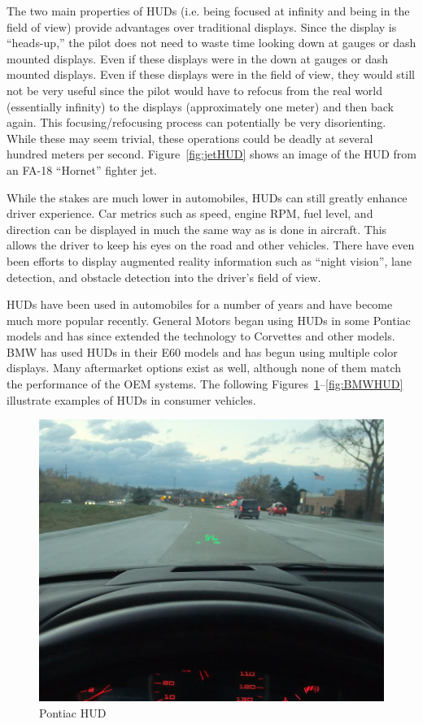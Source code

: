 The two main properties of HUDs (i.e. being focused at infinity and being
in the field of view) provide advantages over traditional displays. Since
the display is ``heads-up,'' the pilot does not need to waste time looking
down at gauges or dash mounted displays. Even if these displays were in the
down at gauges or dash mounted displays. Even if these displays were in the
field of view, they would still not be very useful since the pilot would
have to refocus from the real world (essentially infinity) to the displays
(approximately one meter) and then back again. This focusing/refocusing
process can potentially be very disorienting. While these may seem trivial,
these operations could be deadly at several hundred meters per second.
Figure~\ref{fig:jetHUD} shows an image of the HUD from an FA-18 ``Hornet''
fighter jet.

While the stakes are much lower in automobiles, HUDs can still greatly
enhance driver experience. Car metrics such as speed, engine RPM, fuel
level, and direction can be displayed in much the same way as is done in
aircraft. This allows the driver to keep his eyes on the road and other
vehicles. There have even been efforts to display augmented reality
information such as ``night vision'', lane detection, and obstacle detection
into the driver's field of view.

HUDs have been used in automobiles for a number of years and have become
much more popular recently. General Motors began using HUDs in some Pontiac
models and has since extended the technology to Corvettes and other models.
BMW has used HUDs in their E60 models and has begun using multiple color
displays. Many aftermarket options exist as well, although none of them
match the performance of the OEM systems. The following
Figures~\ref{fig:PontiacHUD}--\ref{fig:BMWHUD} illustrate examples of HUDs
in consumer vehicles.

\begin{figure}
	\includegraphics[width=\textwidth]{img/PontiacHUD.jpg}
	\caption{Pontiac HUD}
	\label{fig:PontiacHUD}
\end{figure}

